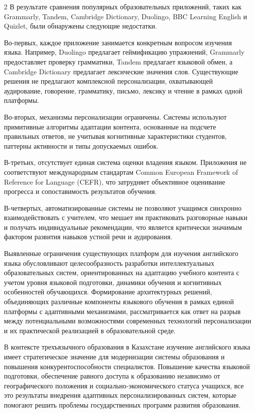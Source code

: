 \begin{multicols}{2}
В результате сравнения популярных образовательных приложений, таких как
Grammarly, Tandem, Cambridge Dictionary, Duolingo, BBC Learning English
и Quizlet, были обнаружены следующие недостатки.

Во-первых, каждое приложение занимается конкретным вопросом изучения
языка. Например, Duolingo предлагает геймификацию упражнений, Grammarly
предоставляет проверку грамматики, Tandem предлагает языковой обмен, а
Cambridge Dictionary предлагает лексические значения слов. Существующие
решения не предлагают комплексной персонализации, охватывающей
аудирование, говорение, грамматику, письмо, лексику и чтение в рамках
одной платформы.

Во-вторых, механизмы персонализации ограничены. Системы используют
примитивные алгоритмы адаптации контента, основанные на подсчете
правильных ответов, не учитывая когнитивные характеристики студентов,
паттерны активности и типы допускаемых ошибок.

В-третьих, отсутствует единая система оценки владения языком. Приложения
не соответствуют международным стандартам Common European Framework of
Reference for Language (CEFR), что затрудняет объективное оценивание
прогресса и сопоставимость результатов обучения.

В-четвертых, автоматизированные системы не позволяют учащимся синхронно
взаимодействовать с учителем, что мешает им практиковать разговорные
навыки и получать индивидуальные рекомендации, что является критически
значимым фактором развития навыков устной речи и аудирования.

Выявленные ограничения существующих платформ для изучения английского
языка обусловливают целесообразность разработки интеллектуальных
образовательных систем, ориентированных на адаптацию учебного контента с
учетом уровня языковой подготовки, динамики обучения и когнитивных
особенностей обучающихся. Формирование архитектурных решений,
объединяющих различные компоненты языкового обучения в рамках единой
платформы с адаптивными механизмами, рассматривается как ответ на разрыв
между потенциальными возможностями современных технологий персонализации
и их практической реализацией в образовательной среде.

В контексте трехъязычного образования в Казахстане изучение английского
языка имеет стратегическое значение для модернизации системы образования
и повышения конкурентоспособности специалистов. Повышение качества
языковой подготовки, обеспечение равного доступа к образованию
независимо от географического положения и социально-экономического
статуса учащихся, все это результаты внедрения адаптивных
персонализированных систем, которые помогают решить проблемы
государственных программ развития образования.


\end{multicols}

